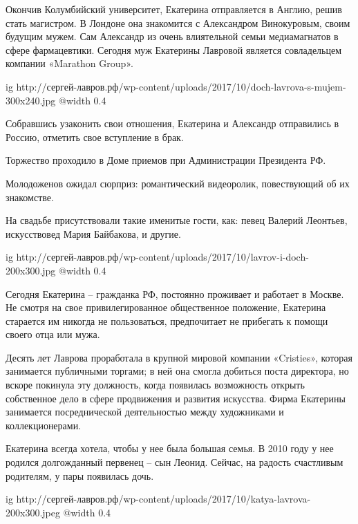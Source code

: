 \begin{itemize}
\begin{itemize}
\begin{multicols}{2}
Окончив Колумбийский университет, Екатерина отправляется в Англию, решив стать
магистром. В Лондоне она знакомится с Александром Винокуровым, своим будущим
мужем. Сам Александр из очень влиятельной семьи медиамагнатов в сфере
фармацевтики. Сегодня муж Екатерины Лавровой является совладельцем компании
«Marathon Group».

\ifcmt
  ig http://сергей-лавров.рф/wp-content/uploads/2017/10/doch-lavrova-s-mujem-300x240.jpg
  @width 0.4
\fi


Собравшись узаконить свои отношения, Екатерина и Александр отправились в
Россию, отметить свое вступление в брак.

Торжество проходило в Доме приемов при Администрации Президента РФ.

Молодоженов ожидал сюрприз: романтический видеоролик, повествующий об их
знакомстве.

На свадьбе присутствовали такие именитые гости, как: певец Валерий Леонтьев,
искусствовед Мария Байбакова, и другие.


\ifcmt
  ig http://сергей-лавров.рф/wp-content/uploads/2017/10/lavrov-i-doch-200x300.jpg
  @width 0.4
\fi

Сегодня Екатерина – гражданка РФ, постоянно проживает и работает в Москве. Не
смотря на свое привилегированное общественное положение, Екатерина старается им
никогда не пользоваться, предпочитает не прибегать к помощи своего отца или
мужа.

Десять лет Лаврова проработала в крупной мировой компании «Cristies», которая
занимается публичными торгами; в ней она смогла добиться поста директора, но
вскоре покинула эту должность, когда появилась возможность открыть собственное
дело в сфере продвижения и развития искусства. Фирма Екатерины занимается
посреднической деятельностью между художниками и коллекционерами.


Екатерина всегда хотела, чтобы у нее была большая семья. В 2010 году у нее
родился долгожданный первенец – сын Леонид. Сейчас, на радость счастливым
родителям, у пары появилась дочь.

\ifcmt
  ig http://сергей-лавров.рф/wp-content/uploads/2017/10/katya-lavrova-200x300.jpeg
  @width 0.4
\fi



\end{multicols}
\end{itemize}
\end{itemize}
